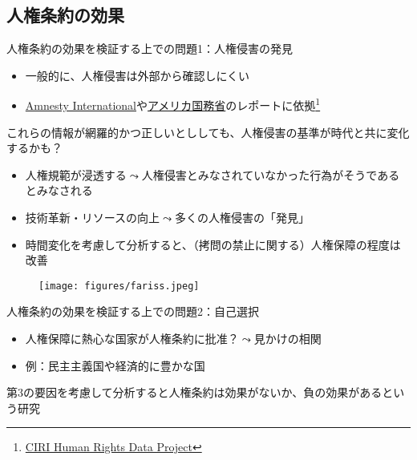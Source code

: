 \documentclass[
  xelatex,
  ja=standard]{bxjsarticle}
\providecommand{\tightlist}{%
  \setlength{\itemsep}{0pt}\setlength{\parskip}{0pt}}\usepackage{longtable,booktabs,array}
\begin{document}
\hypertarget{ux4ebaux6a29ux6761ux7d04ux306eux52b9ux679c}{%
\subsection{人権条約の効果}\label{ux4ebaux6a29ux6761ux7d04ux306eux52b9ux679c}}

人権条約の効果を検証する上での問題1：人権侵害の発見

\begin{itemize}
\tightlist
\item
  一般的に、人権侵害は外部から確認しにくい
\item
  \href{https://www.amnesty.or.jp/}{Amnesty
  International}や\href{https://jp.usembassy.gov/ja/category/reports-ja/}{アメリカ国務省}のレポートに依拠\footnote{\href{http://www.humanrightsdata.com/}{CIRI
    Human Rights Data Project}}
\end{itemize}

これらの情報が網羅的かつ正しいとししても、人権侵害の基準が時代と共に変化するかも？

\begin{itemize}
\tightlist
\item
  人権規範が浸透する\(\leadsto\)人権侵害とみなされていなかった行為がそうであるとみなされる
\item
  技術革新・リソースの向上\(\leadsto\)多くの人権侵害の「発見」
\item
  時間変化を考慮して分析すると、（拷問の禁止に関する）人権保障の程度は改善\citep{fariss2014}
\end{itemize}

\begin{figure}[htpb]

{\centering \texttt{[image: figures/fariss.jpeg]}

}

\caption{\citet{fariss2014}}

\end{figure}

人権条約の効果を検証する上での問題2：自己選択

\begin{itemize}
\tightlist
\item
  人権保障に熱心な国家が人権条約に批准？\(\leadsto\)見かけの相関
\item
  例：民主主義国や経済的に豊かな国
\end{itemize}

第3の要因を考慮して分析すると人権条約は効果がないか、負の効果があるという研究\citep{keith1999, hathaway2001, hafner2005b, hill2010}
\end{document}
